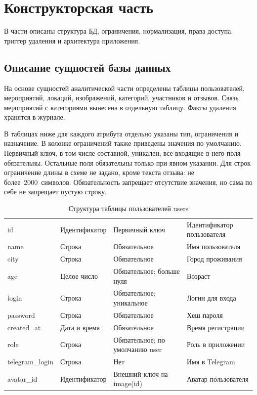 \chapter{Конструкторская часть}

В части описаны структура БД, ограничения, нормализация, права доступа, триггер удаления и архитектура приложения.

\section{Описание сущностей базы данных}
\label{sec:design-entities}

На основе сущностей аналитической части определены таблицы пользователей, мероприятий, локаций, изображений, категорий, участников и отзывов. Связь мероприятий с категориями вынесена в отдельную таблицу. Факты удаления хранятся в журнале.

В таблицах ниже для каждого атрибута отдельно указаны тип, ограничения и назначение. В колонке ограничений также приведены значения по умолчанию. Первичный ключ, в том числе составной, уникален; все входящие в него поля обязательны. Остальные поля обязательны только при явном указании. Для строк ограничение длины в схеме не задано, кроме текста отзыва: не более~2000~символов. Обязательность запрещает отсутствие значения, но сама по себе не запрещает пустую строку.

\begin{table}[H]
    \caption{Структура таблицы пользователей users}
    \label{tab:design-users}
    \small
    \begin{tabularx}{\textwidth}{|L{3.5cm}|L{2.9cm}|Y|Y|}
        \hline
         &  &  &  \\
        \hline
        id & Идентификатор & Первичный ключ & Идентификатор пользователя \\
        \hline
        name & Строка & Обязательное & Имя пользователя \\
        \hline
        city & Строка & Обязательное & Город проживания \\
        \hline
        age & Целое число & Обязательное; больше нуля & Возраст \\
        \hline
        login & Строка & Обязательное; уникальное & Логин для входа \\
        \hline
        password & Строка & Обязательное & Хеш пароля \\
        \hline
        created\_at & Дата и время & Обязательное & Время регистрации \\
        \hline
        role & Строка & Обязательное; по умолчанию user & Роль в приложении \\
        \hline
        telegram\_login & Строка & Нет & Имя в Telegram \\
        \hline
        avatar\_id & Идентификатор & Внешний ключ на image(id) & Аватар пользователя \\
        \hline
    \end{tabularx}
\end{table}

